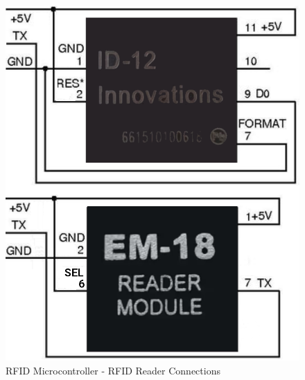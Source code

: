 \begin{figure}[H]
    \includegraphics[scale=0.2]{readers.png}
  \caption{RFID Microcontroller - RFID Reader Connections}
  \label{fig:rfid-board}
\end{figure}

